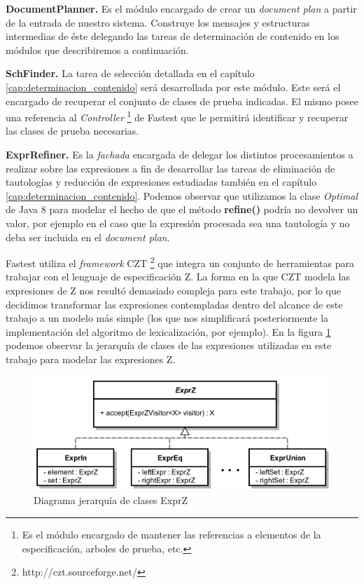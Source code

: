 \bigskip
\noindent
\textbf{DocumentPlanner.} Es el módulo encargado de crear un \textit{document plan} a partir de la entrada de nuestro sistema. Construye los mensajes y estructuras intermedias de éste delegando las tareas de determinación de contenido en los módulos que describiremos a continuación.

\bigskip
\noindent
\textbf{SchFinder.} La tarea de selección detallada en el capítulo \ref{cap:determinacion_contenido} será desarrollada por este módulo. Este será el encargado de recuperar el conjunto de clases de prueba indicadas. El mismo posee una referencia al \emph{Controller} \footnote{Es el módulo encargado de mantener las referencias a elementos de la especificación, arboles de prueba, etc.} de Fastest que le permitirá identificar y recuperar las clases de prueba necesarias. 


\bigskip
\noindent
\textbf{ExprRefiner.} Es la \textit{fachada} \cite{gof} encargada de delegar los distintos procesamientos a realizar sobre las expresiones a fin de desarrollar las tareas de eliminación de tautologías y reducción de expresiones estudiadas también en el capítulo \ref{cap:determinacion_contenido}. Podemos observar que utilizamos la clase \emph{Optimal} de Java 8 para modelar el hecho de que el método \textbf{refine()} podría no devolver un valor, por ejemplo en el caso que la expresión procesada sea una tautología y no deba ser incluida en el \textit{document plan}.

\bigskip
Fastest utiliza el \textit{framework} CZT \footnote{http://czt.sourceforge.net/} que integra un conjunto de herramientas para trabajar con el lenguaje de especificación Z. La forma en la que CZT modela las expresiones de Z nos resultó demasiado compleja para este trabajo, por lo que decidimos transformar las expresiones contempladas dentro del alcance de este trabajo a un modelo más simple (los que nos simplificará posteriormente la implementación del algoritmo de lexicalización, por ejemplo). En la figura \ref{fig:imp_exprz} podemos observar la jerarquía de clases de las expresiones utilizadas en este trabajo para modelar las expresiones Z. 

\begin{figure}[H]
  	\centering
	\includegraphics[scale=0.31]{img/exprz_imp.png}
	\caption{Diagrama jerarquía de clases ExprZ}
  	\label{fig:imp_exprz}
\end{figure}

